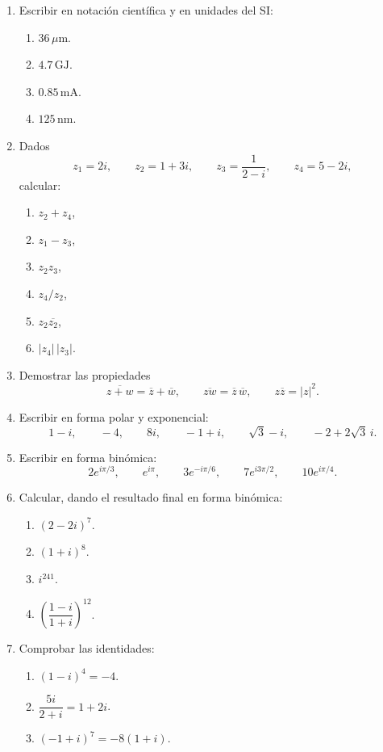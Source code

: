 \begin{enumerate}[label=\textbf{\arabic*.},leftmargin=*]
\item Escribir en notación científica y en unidades del SI:
\begin{enumerate}[label=\alph*)]
\item \(36\,\mu\mathrm{m}\).
\item \(4.7\,\mathrm{GJ}\).
\item \(0.85\,\mathrm{mA}\).
\item \(125\,\mathrm{nm}\).
\end{enumerate}

\item Dados
\[
z_1=2i,\qquad z_2=1+3i,\qquad z_3=\frac1{2-i},\qquad z_4=5-2i,
\]
calcular:
\begin{enumerate}[label=\alph*)]
\item \(z_2+z_4\),
\item \(z_1-z_3\),
\item \(z_2z_3\),
\item \(z_4/z_2\),
\item \(z_2\overline{z_2}\),
\item \(|z_4|\,|z_3|\).
\end{enumerate}

\item Demostrar las propiedades
\[
\overline{z+w}=\overline z+\overline w,
\qquad
\overline{zw}=\overline z\,\overline w,
\qquad
z\overline z=|z|^2.
\]

\item Escribir en forma polar y exponencial:
\[
1-i,\qquad -4,\qquad 8i,\qquad -1+i,\qquad \sqrt3-i,
\qquad -2+2\sqrt3\,i.
\]

\item Escribir en forma binómica:
\[
2e^{i\pi/3},\qquad e^{i\pi},\qquad
3e^{-i\pi/6},\qquad
7e^{i3\pi/2},\qquad
10e^{i\pi/4}.
\]

\item Calcular, dando el resultado final en forma binómica:
\begin{enumerate}[label=\alph*)]
\item \((2-2i)^7\).
\item \((1+i)^8\).
\item \(i^{241}\).
\item \(\left(\dfrac{1-i}{1+i}\right)^{12}\).
\end{enumerate}

\item Comprobar las identidades:
\begin{enumerate}[label=\alph*)]
\item \((1-i)^4=-4\).
\item \(\dfrac{5i}{2+i}=1+2i\).
\item \((-1+i)^7=-8(1+i)\).
\end{enumerate}


\end{enumerate}
